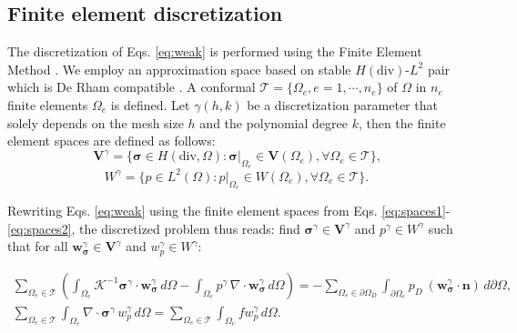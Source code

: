 \documentclass{wccm2024}
\begin{document}
\subsection{Finite element discretization}

The discretization of Eqs. \eqref{eq:weak} is performed using the Finite Element Method \cite{becker1981finite}. We employ an approximation space based on stable $H(\text{div})$-$L^2$ pair which is De Rham compatible \cite{devloo2022efficient,de2013new}. A conformal $\mathcal{T}=\{\Omega_e,e=1, \cdots, n_e \}$ of $\Omega$ in $n_e$ finite elements $\Omega_e$ is defined. Let $\gamma(h,k)$ be a discretization parameter that solely depends on the mesh size $h$ and the polynomial degree $k$, then the finite element spaces are defined as follows:
\vskip -0.3cm
\begin{equation} \label{eq:spaces1}
    \mathbf{V}^\gamma = \{ \boldsymbol{\sigma} \in H(\text{div},\Omega) : \boldsymbol{\sigma}|_{\Omega_e} \in \mathbf{V}(\Omega_e), \forall \Omega_e \in \mathcal{T} \} \text{,}
\end{equation}
\vskip -0.3cm
\begin{equation} \label{eq:spaces2}
    W^\gamma = \{ p \in L^2(\Omega) : p|_{\Omega_e} \in W(\Omega_e), \forall \Omega_e \in \mathcal{T} \} \text{.}
\end{equation}

Rewriting Eqs. \eqref{eq:weak} using the finite element spaces from Eqs. \eqref{eq:spaces1}-\eqref{eq:spaces2}, the discretized problem thus reads: find $\boldsymbol{\sigma}^\gamma \in \mathbf{V}^\gamma$ and $p^\gamma \in W^\gamma$ such that for all $\mathbf{w}_{\boldsymbol{\sigma}}^\gamma \in \mathbf{V}^\gamma$ and $w_p^\gamma \in W^\gamma$:

\begin{equation} \label{eq:discrete}
    \begin{split}
        \sum_{\Omega_e \in \mathcal{T}} \left(\int_{\Omega_e} \mathcal{K}^{-1}\boldsymbol{\sigma}^\gamma \cdot \mathbf{w}_{\boldsymbol{\sigma}}^\gamma \, d\Omega - \int_{\Omega_e} p^\gamma \, \nabla \cdot \mathbf{w}_{\boldsymbol{\sigma}}^\gamma \, d\Omega \right)=- \sum_{\Omega_e \in \partial\Omega_D} \int_{\partial\Omega_e} p_D \ (\mathbf{w}^\gamma_{\boldsymbol{\sigma}} \cdot \mathbf{n}) \, d\partial\Omega, \\
        \sum_{\Omega_e \in \mathcal{T}} \int_{\Omega_e} \nabla \cdot \boldsymbol{\sigma}^\gamma \, w_p^\gamma \, d\Omega = \sum_{\Omega_e \in \mathcal{T}} \int_{\Omega_e} f w_p^\gamma \, d\Omega.
    \end{split}
\end{equation}
\end{document}
